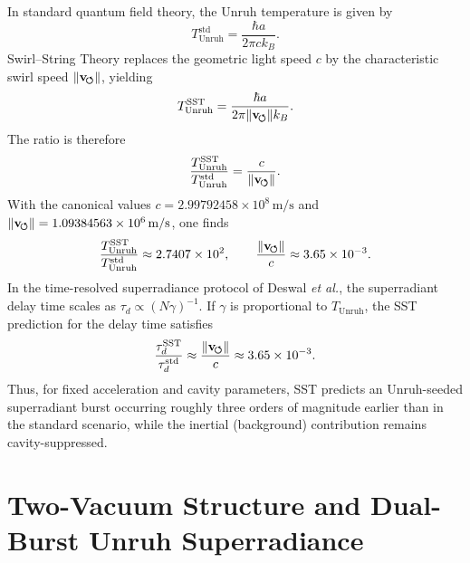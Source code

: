 In standard quantum field theory, the Unruh temperature is given by
\begin{equation}
    T_{\text{Unruh}}^{\text{std}} =
    \frac{\hbar a}{2\pi c k_B}.
\end{equation}
Swirl--String Theory replaces the geometric light speed $c$ by the
characteristic swirl speed $\lVert\mathbf{v}_{\!\boldsymbol{\circlearrowleft}}\rVert$, yielding
\begin{equation}
    T_{\text{Unruh}}^{\text{SST}} =
    \frac{\hbar a}{2\pi \lVert\mathbf{v}_{\!\boldsymbol{\circlearrowleft}}\rVert k_B}.
\end{equation}
The ratio is therefore
\begin{equation}
    \frac{T_{\text{Unruh}}^{\text{SST}}}{T_{\text{Unruh}}^{\text{std}}}
    = \frac{c}{\lVert\mathbf{v}_{\!\boldsymbol{\circlearrowleft}}\rVert}.
\end{equation}
With the canonical values $c = 2.99792458\times 10^{8}\,\mathrm{m/s}$
and $\lVert\mathbf{v}_{\!\boldsymbol{\circlearrowleft}}\rVert = 1.09384563\times 10^{6}\,\mathrm{m/s}$, one finds
\begin{equation}
    \frac{T_{\text{Unruh}}^{\text{SST}}}{T_{\text{Unruh}}^{\text{std}}}
    \approx 2.7407\times 10^{2},
    \qquad
    \frac{\lVert\mathbf{v}_{\!\boldsymbol{\circlearrowleft}}\rVert}{c} \approx 3.65\times 10^{-3}.
\end{equation}
In the time-resolved superradiance protocol of Deswal \emph{et al.},
the superradiant delay time scales as $\tau_d \propto (N\gamma)^{-1}$.
If $\gamma$ is proportional to $T_{\text{Unruh}}$, the SST prediction
for the delay time satisfies
\begin{equation}
    \frac{\tau_d^{\text{SST}}}{\tau_d^{\text{std}}}
    \approx \frac{\lVert\mathbf{v}_{\!\boldsymbol{\circlearrowleft}}\rVert}{c}
    \approx 3.65\times 10^{-3}.
\end{equation}
Thus, for fixed acceleration and cavity parameters, SST predicts an
Unruh-seeded superradiant burst occurring roughly three orders of
magnitude earlier than in the standard scenario, while the inertial
(background) contribution remains cavity-suppressed.

\section{Two-Vacuum Structure and Dual-Burst Unruh Superradiance}
\label{sec:sst_two_vacua_unruh}

